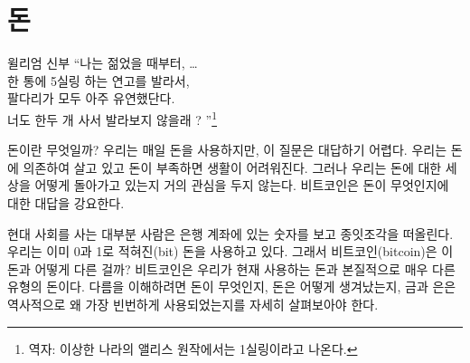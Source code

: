 \chapter{돈}
\label{les:11}

\begin{chapquote}{윌리엄 신부}
\enquote{나는 젊었을 때부터, \ldots \\
한 통에 5실링 하는 연고를 발라서, \\
팔다리가 모두 아주 유연했단다. \\
너도 한두 개 사서 발라보지 않을래 ?
}\footnote{역자: 이상한 나라의 앨리스 원작에서는 1실링이라고 나온다.}
\end{chapquote}


\begin{comment}
What is money? We use it every day, yet this question is surprisingly
difficult to answer. We are dependent on it in ways big and small, and
if we have too little of it our lives become very difficult. Yet, we
seldom think about the thing which supposedly makes the world go round.
Bitcoin forced me to answer this question over and over again: What the
hell is money?
\end{comment}
돈이란 무엇일까? 
우리는 매일 돈을 사용하지만, 이 질문은 대답하기 어렵다. 
우리는 돈에 의존하여 살고 있고 돈이 부족하면 생활이 어려워진다. 
그러나 우리는 돈에 대한 세상을 어떻게 돌아가고 있는지 거의 관심을 두지 않는다.
비트코인은 돈이 무엇인지에 대한 대답을 강요한다.

\begin{comment}
In our \enquote{modern} world, most people will probably think of pieces of
paper when they talk about money, even though most of our money is just
a number in a bank account. We are already using zeros and ones as our
money, so how is Bitcoin different? Bitcoin is different because at its
core it is a very different \textit{type} of money than the money we currently
use. To understand this, we will have to take a closer look at what
money is, how it came to be, and why gold and silver was used for most
of commercial history.
\end{comment}
현대 사회를 사는 대부분 사람은 은행 계좌에 있는 숫자를 보고 종잇조각을 떠올린다.
우리는 이미 0과 1로 적혀진(bit) 돈을 사용하고 있다. 
그래서 비트코인(bitcoin)은 이 돈과 어떻게 다른 걸까?
비트코인은 우리가 현재 사용하는 돈과 본질적으로 매우 다른 유형의 돈이다. 
다름을 이해하려면 돈이 무엇인지, 돈은 어떻게 생겨났는지, 
금과 은은 역사적으로 왜 가장 빈번하게 사용되었는지를
자세히 살펴보아야 한다.

